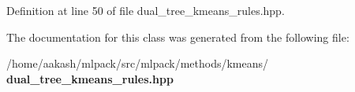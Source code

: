 Definition at line 50 of file dual\+\_\+tree\+\_\+kmeans\+\_\+rules.\+hpp.



The documentation for this class was generated from the following file\+:\begin{DoxyCompactItemize}
\item 
/home/aakash/mlpack/src/mlpack/methods/kmeans/\textbf{ dual\+\_\+tree\+\_\+kmeans\+\_\+rules.\+hpp}\end{DoxyCompactItemize}
